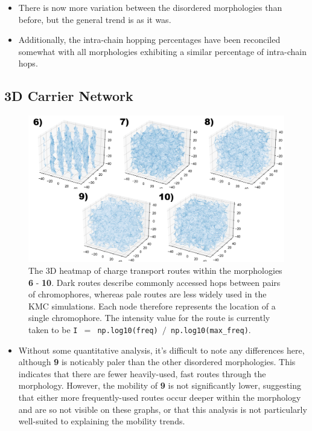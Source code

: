 \documentclass[12pt]{article}
\begin{document}
\begin{itemize}
    \item{There is now more variation between the disordered morphologies than before, but the general trend is as it was.}
    \item{Additionally, the intra-chain hopping percentages have been reconciled somewhat with all morphologies exhibiting a similar percentage of intra-chain hops.}
\end{itemize}


\subsection{3D Carrier Network}

\begin{figure}[h!]\centering
	\includegraphics[width=\textwidth]{Figures/Shrunk3dHole.pdf}
    \caption{The 3D heatmap of charge transport routes within the morphologies \textbf{6} - \textbf{10}.
    Dark routes describe commonly accessed hops between pairs of chromophores, whereas pale routes are less widely used in the KMC simulations.
    Each node therefore represents the location of a single chromophore.
The intensity value for the route is currently taken to be \texttt{I $=$ np.log10(freq) $/$ np.log10(max\_freq)}.}
	\label{fig:3dNetwork}
\end{figure}

\begin{itemize}
    \item{Without some quantitative analysis, it's difficult to note any differences here, although \textbf{9} is noticably paler than the other disordered morphologies. 
        This indicates that there are fewer heavily-used, fast routes through the morphology.
    However, the mobility of \textbf{9} is not significantly lower, suggesting that either more frequently-used routes occur deeper within the morphology and are so not visible on these graphs, or that this analysis is not particularly well-suited to explaining the mobility trends.}
\end{itemize}
\end{document}
